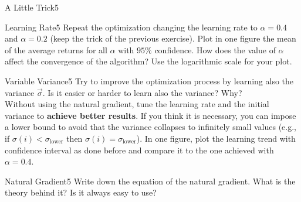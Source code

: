 \begin{questions}
\begin{question}{A Little Trick}{5}
\begin{answer}\end{answer}
\end{question}
	


\begin{question}{Learning Rate}{5}
	Repeat the optimization changing the learning rate to $\alpha=0.4$ and $\alpha = 0.2$ (keep the trick of the previous exercise).
	Plot in one figure the mean of the average returns for all $\alpha$ with $95\%$ confidence.
	How does the value of $\alpha$ affect the convergence of the algorithm? 
	Use the logarithmic scale for your plot.
		
\begin{answer}\end{answer}
\end{question}

	
\begin{question}{Variable Variance}{5}
	Try to improve the optimization process by learning also the variance $\vec \sigma$. Is it easier or harder to learn also the variance? Why?
	\\Without using the natural gradient, tune the learning rate and the initial variance to \textbf{achieve better results}. If you think it is necessary, you can impose a lower bound to avoid that the variance collapses to infinitely small values (e.g., if $\sigma(i)<\sigma_{\text{lower}}$ then $\sigma(i) = \sigma_{\text{lower}}$).
	In one figure, plot the learning trend with confidence interval as done before and compare it to the one achieved with $\alpha = 0.4$.
	
\begin{answer}\end{answer}
\end{question}


	
\begin{question}[bonus]{Natural Gradient}{5}
	Write down the equation of the natural gradient. What is the theory behind it?
	Is it always easy to use?
	
\begin{answer}\end{answer}
\end{question}

\end{questions}